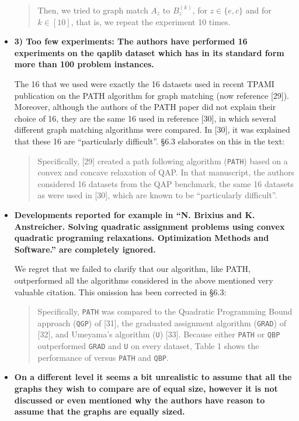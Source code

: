 \documentclass[11pt]{article}
\begin{document}
\begin{itemize}
	\begin{quote}
Then, we tried to graph match $A_z$ to $B_z^{(k)}$, for $z \in \{e,c\}$ and for $k \in [10]$, that is, we repeat the experiment 10 times. 
	\end{quote}

	\item \textbf{3) Too few experiments:
	The authors have performed 16 experiments on
	the qaplib dataset which has in its standard form
	more than 100 problem instances.
	}

	The 16 that we used were exactly the 16 datasets used in recent TPAMI publication on the PATH algorithm for graph matching (now reference [29]).  Moreover, although the authors of the PATH paper did not explain their choice of 16, they are the same 16 used in reference [30], in which several different graph matching algorithms were compared.  In [30], it was explained that these 16 are ``particularly difficult''.  \S 6.3 elaborates on this in the text:
	
	\begin{quote}
		Specifically, [29] created a path following algorithm (\texttt{PATH}) based on a convex and concave relaxation of QAP. In that manuscript, the authors considered 16 datasets from the QAP benchmark, the same 16 datasets as were used in [30], which are known to be ``particularly difficult''. 
	\end{quote}
	
	\item \textbf{Developments reported for example in
``N. Brixius and K. Anstreicher. Solving quadratic assignment problems
using convex quadratic programing relaxations. Optimization Methods
and Software.'' are completely ignored.
}


We regret that we failed to clarify that our algorithm, like PATH, outperformed all the algorithms considered in the above mentioned very valuable citation.  This omission has been corrected in \S 6.3:

	\begin{quote}
Specifically, \texttt{PATH} was compared to the Quadratic Programming Bound approach (\texttt{QGP}) of [31], the graduated assignment algorithm (\texttt{GRAD}) of [32], and Umeyama's algorithm (\texttt{U}) [33].  Because either \texttt{PATH} or \texttt{QBP} outperformed \texttt{GRAD} and \texttt{U} on every dataset, Table 1 shows the performance of \faqap versus \texttt{PATH} and \texttt{QBP}. 
	\end{quote}

	\item \textbf{On a different level it seems a bit unrealistic to assume that all the
graphs they wish to compare are of equal size, however
it is not discussed or even mentioned why the authors have
reason to assume that the graphs are equally sized.}



\end{itemize}
\end{document}
